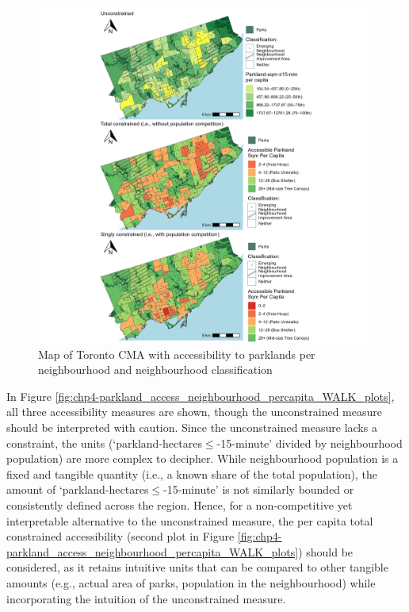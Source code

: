 \documentclass[
11pt, %
oneside, %
english, %
singlespacing, %
]{macthesis} %
\begin{document}
\begin{figure}

{\centering \includegraphics[width=6in]{./data/figures/chp4-parkland_access_neighbourhood_percapita_WALK_plots} 

}

\caption{\label{fig:chp4-parkland_access_neighbourhood_percapita_WALK_plots}Map of Toronto CMA with accessibility to parklands per neighbourhood and neighbourhood classification}\label{fig:unnamed-chunk-60}
\end{figure}

In Figure \ref{fig:chp4-parkland_access_neighbourhood_percapita_WALK_plots}, all three accessibility measures are shown, though the unconstrained measure should be interpreted with caution. Since the unconstrained measure lacks a constraint, the units (`parkland-hectares\(\le\)-15-minute' divided by neighbourhood population) are more complex to decipher. While neighbourhood population is a fixed and tangible quantity (i.e., a known share of the total population), the amount of `parkland-hectares\(\le\)-15-minute' is not similarly bounded or consistently defined across the region. Hence, for a non-competitive yet interpretable alternative to the unconstrained measure, the per capita total constrained accessibility (second plot in Figure \ref{fig:chp4-parkland_access_neighbourhood_percapita_WALK_plots}) should be considered, as it retains intuitive units that can be compared to other tangible amounts (e.g., actual area of parks, population in the neighbourhood) while incorporating the intuition of the unconstrained measure.
\end{document}
